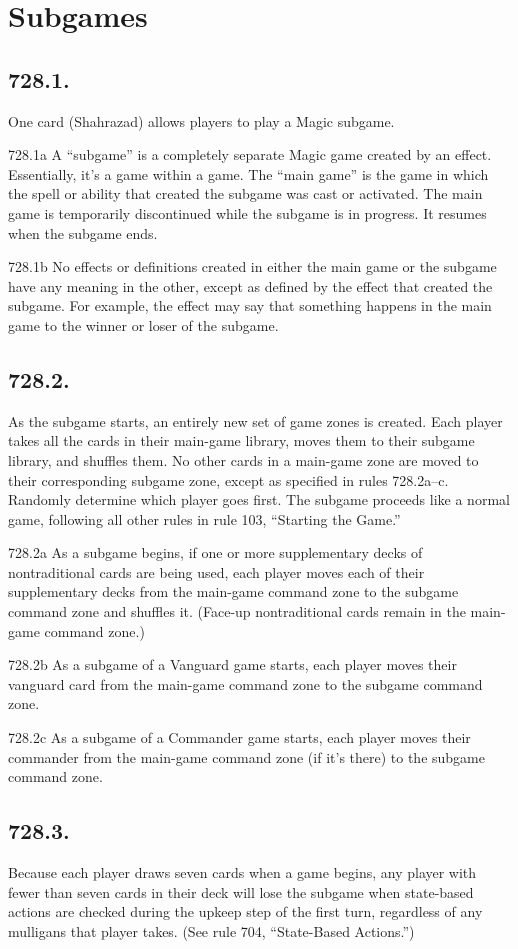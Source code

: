 \section{Subgames}
\subsection*{728.1.}
One card (Shahrazad) allows players to play a Magic subgame.

728.1a A “subgame” is a completely separate Magic game created by an effect. Essentially, it’s a game within a game. The “main game” is the game in which the spell or ability that created the subgame was cast or activated. The main game is temporarily discontinued while the subgame is in progress. It resumes when the subgame ends.

728.1b No effects or definitions created in either the main game or the subgame have any meaning in the other, except as defined by the effect that created the subgame. For example, the effect may say that something happens in the main game to the winner or loser of the subgame.

\subsection*{728.2.}
As the subgame starts, an entirely new set of game zones is created. Each player takes all the cards in their main-game library, moves them to their subgame library, and shuffles them. No other cards in a main-game zone are moved to their corresponding subgame zone, except as specified in rules 728.2a–c. Randomly determine which player goes first. The subgame proceeds like a normal game, following all other rules in rule 103, “Starting the Game.”

728.2a As a subgame begins, if one or more supplementary decks of nontraditional cards are being used, each player moves each of their supplementary decks from the main-game command zone to the subgame command zone and shuffles it. (Face-up nontraditional cards remain in the main-game command zone.)

728.2b As a subgame of a Vanguard game starts, each player moves their vanguard card from the main-game command zone to the subgame command zone.

728.2c As a subgame of a Commander game starts, each player moves their commander from the main-game command zone (if it’s there) to the subgame command zone.

\subsection*{728.3.}
Because each player draws seven cards when a game begins, any player with fewer than seven cards in their deck will lose the subgame when state-based actions are checked during the upkeep step of the first turn, regardless of any mulligans that player takes. (See rule 704, “State-Based Actions.”)

